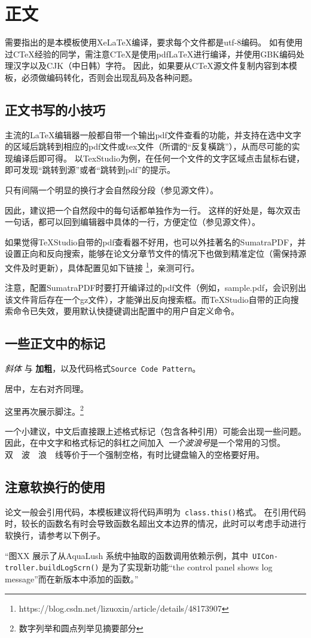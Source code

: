 \chapter{正文}

需要指出的是本模板使用XeLaTeX编译，要求每个文件都是utf-8编码。
如有使用过CTeX经验的同学，需注意CTeX是使用pdfLaTeX进行编译，并使用GBK编码处理汉字以及CJK（中日韩）字符。
因此，如果要从CTeX源文件复制内容到本模板，必须做编码转化，否则会出现乱码及各种问题。

\section{正文书写的小技巧}
主流的LaTeX编辑器一般都自带一个输出pdf文件查看的功能，并支持在选中文字的区域后跳转到相应的pdf文件或tex文件（所谓的“反复橫跳”），从而尽可能的实现编译后即可得。
以TexStudio为例，在任何一个文件的文字区域点击鼠标右键，即可发现“跳转到源”或者“跳转到pdf”的提示。

只有间隔一个明显的换行才会自然段分段（参见源文件）。

因此，建议把一个自然段中的每句话都单独作为一行。
这样的好处是，每次双击一句话，都可以回到编辑器中具体的一行，方便定位（参见源文件）。

如果觉得TeXStudio自带的pdf查看器不好用，也可以外挂著名的SumatraPDF，并设置正向和反向搜索，能够在论文分章节文件的情况下也做到精准定位（需保持源文件及时更新），具体配置见如下链接 \footnote{https://blog.csdn.net/lizuoxin/article/details/48173907}，亲测可行。

注意，配置SumatraPDF时要打开编译过的pdf文件（例如，sample.pdf，会识别出该文件背后存在一个gz文件），才能弹出反向搜索框。而TeXStudio自带的正向搜索命令已失效，要用默认快捷键调出配置中的用户自定义命令。

\section{一些正文中的标记}
\emph{斜体} 与 \textbf{加粗}，以及代码格式\texttt{Source Code Pattern}。

\begin{center}
居中，左右对齐同理。
\end{center}

这里再次展示脚注。\footnote{数字列举和圆点列举见摘要部分}

一个小建议，中文后直接跟上述格式标记（包含各种引用）可能会出现一些问题。
因此，在中文字和格式标记的斜杠之间加入~\emph{一个波浪号}是一个常用的习惯。
双~~波~~浪~~线等价于一个强制空格，有时比键盘输入的空格要好用。


\section{注意软换行的使用}
论文一般会引用代码，本模板建议将代码声明为~\texttt{class.this()}格式。
在引用代码时，较长的函数名有时会导致函数名超出文本边界的情况，此时可以考虑手动进行软换行，请参考以下例子。

“图XX 展示了从AquaLush 系统中抽取的函数调用依赖示例，其中~\texttt{UICon-} \linebreak \texttt{troller.buildLogScrn()} 是为了实现新功能“the control panel shows log message”而在新版本中添加的函数。”
